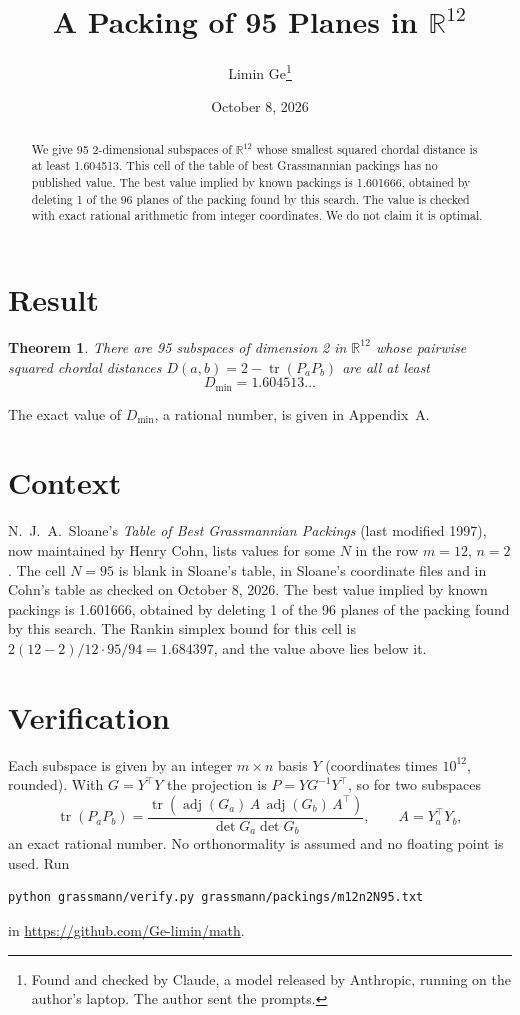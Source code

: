 \documentclass[11pt,a4paper]{article}
\title{A Packing of 95 Planes in $\mathbb{R}^{12}$}
\author{Limin Ge\thanks{Found and checked by Claude, a model released by Anthropic, running on the author's laptop. The author sent the prompts.}}
\date{October 8, 2026}
\newtheorem*{theorem}{Theorem}
\begin{document}
\maketitle
\begin{abstract}
We give 95 2-dimensional subspaces of $\mathbb{R}^{12}$ whose smallest squared chordal distance is at least 1.604513. This cell of the table of best Grassmannian packings has no published value. The best value implied by known packings is 1.601666, obtained by deleting 1 of the 96 planes of the packing found by this search. The value is checked with exact rational arithmetic from integer coordinates. We do not claim it is optimal.
\end{abstract}

\section{Result}
\begin{theorem}
There are 95 subspaces of dimension 2 in $\mathbb{R}^{12}$ whose pairwise squared chordal distances $D(a,b) = 2 - \operatorname{tr}(P_aP_b)$ are all at least
\[ D_{\min} = 1.604513\ldots \]
\end{theorem}
The exact value of $D_{\min}$, a rational number, is given in Appendix~A.


\section{Context}
N.~J.~A.~Sloane's \emph{Table of Best Grassmannian Packings} (last modified 1997), now maintained by Henry Cohn, lists values for some $N$ in the row $m=12$, $n=2$. The cell $N=95$ is blank in Sloane's table, in Sloane's coordinate files and in Cohn's table as checked on October 8, 2026. The best value implied by known packings is 1.601666, obtained by deleting 1 of the 96 planes of the packing found by this search. The Rankin simplex bound for this cell is $2(12-2)/12\cdot 95/94 = 1.684397$, and the value above lies below it.


\section{Verification}
Each subspace is given by an integer $m\times n$ basis $Y$ (coordinates times $10^{12}$, rounded). With $G=Y^\top Y$ the projection is $P=YG^{-1}Y^\top$, so for two subspaces
\[ \operatorname{tr}(P_aP_b)=\frac{\operatorname{tr}(\operatorname{adj}(G_a)\,A\,\operatorname{adj}(G_b)\,A^\top)}{\det G_a\det G_b},\qquad A=Y_a^\top Y_b, \]
an exact rational number. No orthonormality is assumed and no floating point is used. Run
\begin{verbatim}
python grassmann/verify.py grassmann/packings/m12n2N95.txt
\end{verbatim}
in \url{https://github.com/Ge-limin/math}.
\end{document}
